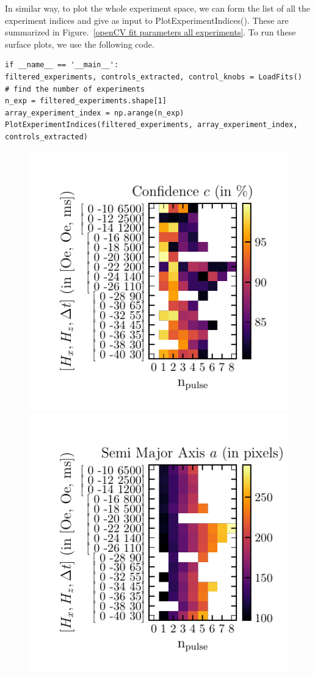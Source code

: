 \documentclass[12pt, twoside, a4paper]{article}
\begin{document}
In similar way, to plot the whole experiment space, we can form the list of all the experiment indices and give as input to PlotExperimentIndices(). These are summarized in Figure.~\ref{openCV fit parameters all experiments}. To run these surface plots, we use the following code.
%
\begin{verbatim}
if __name__ == '__main__':
filtered_experiments, controls_extracted, control_knobs = LoadFits()
# find the number of experiments
n_exp = filtered_experiments.shape[1]
array_experiment_index = np.arange(n_exp)
PlotExperimentIndices(filtered_experiments, array_experiment_index, controls_extracted)
\end{verbatim}
%
\begin{figure}[!htbp]
	\centering
	\includegraphics[scale=1.0]{figures/12_FitsFullSpace/0_1_2_3_4_5_6_7_8_9_10_11_12_13_14_15__Confidence.pdf}\\
	\includegraphics[scale=1.0]{figures/12_FitsFullSpace/0_1_2_3_4_5_6_7_8_9_10_11_12_13_14_15__Semi-Major-Axis.pdf}

\end{figure}
\end{document}
